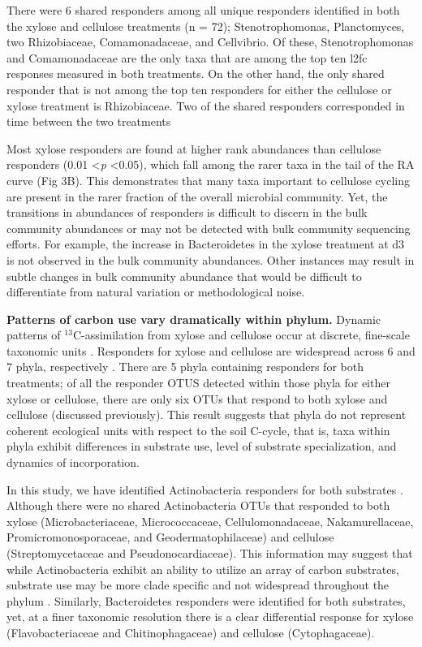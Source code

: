 There were 6 shared responders among all unique responders identified in both
the xylose and cellulose treatments (n = 72); Stenotrophomonas, Planctomyces,
two Rhizobiaceae, Comamonadaceae, and Cellvibrio. Of these, Stenotrophomonas
and Comamonadaceae are the only taxa that are among the top ten l2fc responses
measured in both treatments. On the other hand, the only shared responder that
is not among the top ten responders for either the cellulose or xylose
treatment is Rhizobiaceae. Two of the shared responders corresponded in time
between the two treatments

Most xylose responders are found at higher rank abundances than cellulose
responders (0.01 \textless \textit{p} \textless 0.05), which fall among the
rarer taxa in the tail of the RA curve (Fig 3B). This demonstrates that many
taxa important to cellulose cycling are present in the rarer fraction of the
overall microbial community. Yet, the transitions in abundances of responders
is difficult to discern in the bulk community abundances or may not be detected
with bulk community sequencing efforts. For example, the increase in
Bacteroidetes in the xylose treatment at d3 is not observed in the bulk
community abundances. Other instances may result in subtle changes in bulk
community abundance that would be difficult to differentiate from natural
variation or methodological noise.

\textbf{Patterns of carbon use vary dramatically within phylum.} Dynamic
patterns of $^{13}$C-assimilation from xylose and cellulose occur at discrete,
fine-scale taxonomic units . Responders for xylose and cellulose are widespread
across 6 and 7 phyla, respectively . There are 5 phyla containing responders
for both treatments; of all the responder OTUS detected within those phyla for
either xylose or cellulose, there are only six OTUs that respond to both xylose
and cellulose (discussed previously). This result suggests that phyla do not
represent coherent ecological units with respect to the soil C-cycle, that is,
taxa within phyla exhibit differences in substrate use, level of substrate
specialization, and dynamics of incorporation. 

In this study, we have identified Actinobacteria responders for both substrates
. Although there were no shared Actinobacteria OTUs that responded to both
xylose (Microbacteriaceae, Micrococcaceae, Cellulomonadaceae, Nakamurellaceae,
Promicromonosporaceae, and Geodermatophilaceae) and cellulose
(Streptomycetaceae and Pseudonocardiaceae). This information may suggest that
while Actinobacteria exhibit an ability to utilize an array of carbon
substrates, substrate use may be more clade specific and not widespread
throughout the phylum . Similarly, Bacteroidetes responders were identified for
both substrates, yet, at a finer taxonomic resolution there is a clear
differential response for xylose (Flavobacteriaceae and Chitinophagaceae) and
cellulose (Cytophagaceae). 

